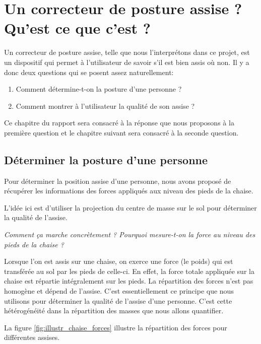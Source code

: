 \documentclass{polytech/polytech}
\begin{document}
\chapter{Un correcteur de posture assise ? Qu'est ce que c'est ?}
\label{chap:correcteur posture}

Un correcteur de posture assise, telle que nous l'interprétons dans ce projet, est un dispositif qui permet à l'utilisateur de savoir s'il est bien assis où non. Il y a donc deux questions qui se posent assez naturellement:

\begin{enumerate}
\item Comment détermine-t-on la posture d'une personne ?
\item Comment montrer à l'utilisateur la qualité de son assise ?
\end{enumerate}

Ce chapitre du rapport sera consacré à la réponse que nous proposons à la première question et le chapitre suivant sera consacré à la seconde question.

\section{Déterminer la posture d'une personne}
\label{chap:posture_determination}

Pour déterminer la position assise d'une personne, nous avons proposé de récupérer les informations des forces appliqués aux niveau des pieds de la chaise. 

L'idée ici est d'utiliser la projection du centre de masse sur le sol pour déterminer la qualité de l'assise. 

\begin{center}
\textit{Comment ça marche concrètement ? Pourquoi mesure-t-on la force au niveau des pieds de la chaise ?} 
\end{center}

Lorsque l'on est assis sur une chaise, on exerce une force (le poids) qui est transférée au sol par les pieds de celle-ci. En effet, la force totale appliquée sur la chaise est répartie intégralement sur les pieds.
La répartition des forces n'est pas homogène et dépend de l'assise. C'est essentiellement ce principe que nous utilisons pour déterminer la qualité de l'assise d'une personne. C'est cette hétérogénéité dans la répartition des masses que nous allons quantifier.

La figure \ref{fig:illustr_chaise_forces} illustre la répartition des forces pour différentes assises.
\end{document}
